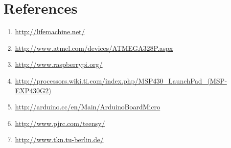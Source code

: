 \documentclass[12pt]{article} %
\begin{document}
\section*{References} %
\begin{enumerate}
\item \url{http://lifemachine.net/}
\item \url{http://www.atmel.com/devices/ATMEGA328P.aspx}
\item \url{http://www.raspberrypi.org/}
\item \url{http://processors.wiki.ti.com/index.php/MSP430_LaunchPad_(MSP-EXP430G2)}
\item \url{http://arduino.cc/en/Main/ArduinoBoardMicro}
\item \url{http://www.pjrc.com/teensy/}
\item \url{http://www.tkn.tu-berlin.de/}
\end{enumerate}
\end{document}
